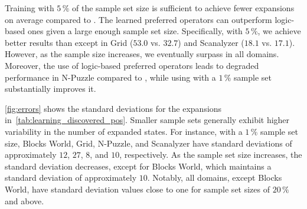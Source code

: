 \documentclass[ppgc,diss,english]{iiufrgs}
\begin{document}
Training with $5\,\%$ of the sample set size is sufficient to achieve fewer expansions on average compared to \poff. The learned preferred operators \pog can outperform logic-based ones given a large enough sample set size. Specifically, with $5\,\%$, we achieve better results than \poff except in Grid ($53.0$ vs. $32.7$) and Scanalyzer ($18.1$ vs. $17.1$). However, as the sample size increases, we eventually surpass \poff in all domains. Moreover, the use of logic-based preferred operators \poff leads to degraded performance in N-Puzzle compared to \hnn, while using \pog with a $1\,\%$ sample set substantially improves it.

\cref{fig:errors} shows the standard deviations for the expansions in~\cref{tab:learning_discovered_pos}. Smaller sample sets generally exhibit higher variability in the number of expanded states. For instance, with a $1\,\%$ sample set size, Blocks World, Grid, N-Puzzle, and Scanalyzer have standard deviations of approximately $12$, $27$, $8$, and $10$, respectively. As the sample set size increases, the standard deviation decreases, except for Blocks World, which maintains a standard deviation of approximately $10$. Notably, all domains, except Blocks World, have standard deviation values close to one for sample set sizes of $20\,\%$ and above.
\end{document}
